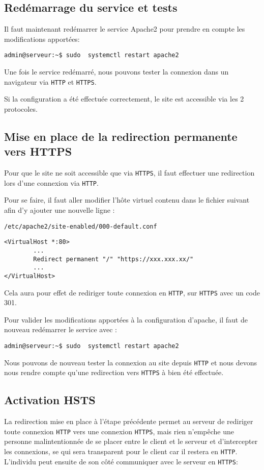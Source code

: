 \subsection{Redémarrage du service et tests}
Il faut maintenant redémarrer le service Apache2 pour prendre en compte les modifications apportées:

\begin{verbatim}
admin@serveur:~$ sudo  systemctl restart apache2
\end{verbatim}
 

Une fois le service redémarré, nous pouvons tester la connexion dans un navigateur via \texttt{HTTP} et \texttt{HTTPS}.

Si la configuration a été effectuée correctement, le site est accessible via les 2 protocoles.

\subsection{Mise en place de la redirection permanente vers HTTPS}
Pour que le site ne soit accessible que via \texttt{HTTPS}, il faut effectuer une redirection lors d'une connexion via \texttt{HTTP}.

Pour se faire, il faut aller modifier l'hôte virtuel contenu dans le fichier suivant afin d'y ajouter une nouvelle ligne :

\texttt{/etc/apache2/site-enabled/000-default.conf} 
 
\begin{verbatim}
<VirtualHost *:80>
        ...
        Redirect permanent "/" "https://xxx.xxx.xx/"
        ...
</VirtualHost>
\end{verbatim}
 

Cela aura pour effet de rediriger toute connexion en \texttt{HTTP}, sur \texttt{HTTPS} avec un code 301.

Pour valider les modifications apportées à la configuration d'apache, il faut de nouveau redémarrer le service avec :
 
\begin{verbatim}
admin@serveur:~$ sudo  systemctl restart apache2
\end{verbatim}
 

Nous pouvons de nouveau tester la connexion au site depuis \texttt{HTTP} et nous devons nous rendre compte qu'une redirection vers \texttt{HTTPS} à bien été effectuée. 


\subsection{Activation HSTS}
La redirection mise en place à l'étape précédente permet au serveur de rediriger toute connexion \texttt{HTTP} vers une connexion \texttt{HTTPS}, mais rien n'empêche une personne malintentionnée de se placer entre le client et le serveur et d'intercepter les connexions, se qui sera transparent pour le client car il restera en \texttt{HTTP}. L'individu peut ensuite de son côté communiquer avec le serveur en \texttt{HTTPS}:

